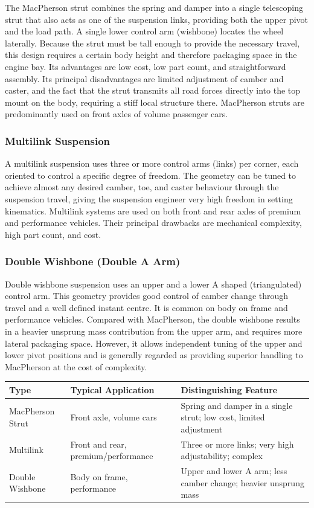 \documentclass[10pt,a4paper]{article}
\begin{document}
The MacPherson strut combines the spring and damper into a single telescoping strut that also acts as one of the suspension links, providing both the upper pivot and the load path. A single lower control arm (wishbone) locates the wheel laterally. Because the strut must be tall enough to provide the necessary travel, this design requires a certain body height and therefore packaging space in the engine bay. Its advantages are low cost, low part count, and straightforward assembly. Its principal disadvantages are limited adjustment of camber and caster, and the fact that the strut transmits all road forces directly into the top mount on the body, requiring a stiff local structure there. MacPherson struts are predominantly used on front axles of volume passenger cars.

\subsubsection{Multilink Suspension}

A multilink suspension uses three or more control arms (links) per corner, each oriented to control a specific degree of freedom. The geometry can be tuned to achieve almost any desired camber, toe, and caster behaviour through the suspension travel, giving the suspension engineer very high freedom in setting kinematics. Multilink systems are used on both front and rear axles of premium and performance vehicles. Their principal drawbacks are mechanical complexity, high part count, and cost.

\subsubsection{Double Wishbone (Double A Arm)}

Double wishbone suspension uses an upper and a lower A shaped (triangulated) control arm. This geometry provides good control of camber change through travel and a well defined instant centre. It is common on body on frame and performance vehicles. Compared with MacPherson, the double wishbone results in a heavier unsprung mass contribution from the upper arm, and requires more lateral packaging space. However, it allows independent tuning of the upper and lower pivot positions and is generally regarded as providing superior handling to MacPherson at the cost of complexity.

\begin{center}\small
\begin{tabular}{@{}lll@{}}
\toprule
Type & Typical Application & Distinguishing Feature \\
\midrule
MacPherson Strut & Front axle, volume cars & Spring and damper in a single strut; low cost, limited adjustment \\
Multilink & Front and rear, premium/performance & Three or more links; very high adjustability; complex \\
Double Wishbone & Body on frame, performance & Upper and lower A arm; less camber change; heavier unsprung mass \\
\bottomrule
\end{tabular}
\end{center}
\end{document}
